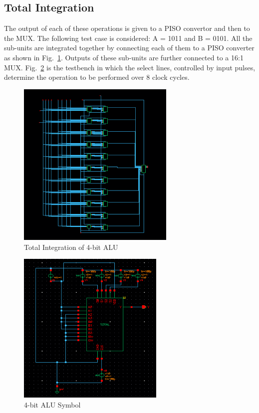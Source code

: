 \documentclass[conference]{IEEEtran}
\begin{document}
\subsection{Total Integration}\label{DC}
The output of each of these operations is given to a PISO convertor and then to the MUX. The following  test case  is considered:  A  =  1011 and B = 0101. All the sub-units are integrated together by connecting each of them to a PISO converter as shown in Fig.~\ref{fig8}. Outputs of these sub-units are further connected to a 16:1 MUX. Fig.~\ref{fig9} is the testbench in which the select lines, controlled by input pulses, determine the operation to be performed over 8 clock cycles.
\begin{figure}[H]
\centerline{\includegraphics[height=8cm,keepaspectratio,]{"ALU_Schematic.png"}}
\caption{Total Integration of 4-bit ALU }
\label{fig8}
\end{figure}
\begin{figure}[H]
\centerline{\includegraphics[width=7cm,keepaspectratio,]{"ALU_Symbol.png"}}
\caption{4-bit ALU Symbol }
\label{fig9}
\end{figure}
\end{document}
